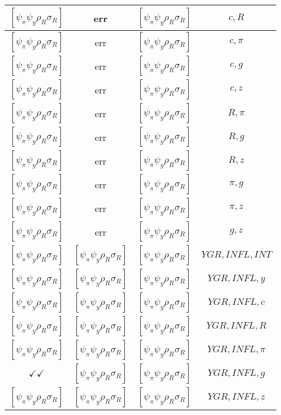 \documentclass[a4paper,10pt]{article}
\begin{document}
\begin{longtable}{|c|c|c|c|}
\hline
$[\psi_\pi \psi_y \rho_R \sigma_R ]$ & err & $[\psi_\pi \psi_y \rho_R \sigma_R ]$ & ${c},{R}$ \\
\hline
$[\psi_\pi \psi_y \rho_R \sigma_R ]$ & err & $[\psi_\pi \psi_y \rho_R \sigma_R ]$ & ${c},{\pi}$ \\
\hline
$[\psi_\pi \psi_y \rho_R \sigma_R ]$ & err & $[\psi_\pi \psi_y \rho_R \sigma_R ]$ & ${c},{g}$ \\
\hline
$[\psi_\pi \psi_y \rho_R \sigma_R ]$ & err & $[\psi_\pi \psi_y \rho_R \sigma_R ]$ & ${c},{z}$ \\
\hline
$[\psi_\pi \psi_y \rho_R \sigma_R ]$ & err & $[\psi_\pi \psi_y \rho_R \sigma_R ]$ & ${R},{\pi}$ \\
\hline
$[\psi_\pi \psi_y \rho_R \sigma_R ]$ & err & $[\psi_\pi \psi_y \rho_R \sigma_R ]$ & ${R},{g}$ \\
\hline
$[\psi_\pi \psi_y \rho_R \sigma_R ]$ & err & $[\psi_\pi \psi_y \rho_R \sigma_R ]$ & ${R},{z}$ \\
\hline
$[\psi_\pi \psi_y \rho_R \sigma_R ]$ & err & $[\psi_\pi \psi_y \rho_R \sigma_R ]$ & ${\pi},{g}$ \\
\hline
$[\psi_\pi \psi_y \rho_R \sigma_R ]$ & err & $[\psi_\pi \psi_y \rho_R \sigma_R ]$ & ${\pi},{z}$ \\
\hline
$[\psi_\pi \psi_y \rho_R \sigma_R ]$ & err & $[\psi_\pi \psi_y \rho_R \sigma_R ]$ & ${g},{z}$ \\
\hline
$[\psi_\pi \psi_y \rho_R \sigma_R ]$ & $[\psi_\pi \psi_y \rho_R \sigma_R ]$ & $[\psi_\pi \psi_y \rho_R \sigma_R ]$ & ${YGR},{INFL},{INT}$ \\
\hline
$[\psi_\pi \psi_y \rho_R \sigma_R ]$ & $[\psi_\pi \psi_y \rho_R \sigma_R ]$ & $[\psi_\pi \psi_y \rho_R \sigma_R ]$ & ${YGR},{INFL},{y}$ \\
\hline
$[\psi_\pi \psi_y \rho_R \sigma_R ]$ & $[\psi_\pi \psi_y \rho_R \sigma_R ]$ & $[\psi_\pi \psi_y \rho_R \sigma_R ]$ & ${YGR},{INFL},{c}$ \\
\hline
$[\psi_\pi \psi_y \rho_R \sigma_R ]$ & $[\psi_\pi \psi_y \rho_R \sigma_R ]$ & $[\psi_\pi \psi_y \rho_R \sigma_R ]$ & ${YGR},{INFL},{R}$ \\
\hline
$[\psi_\pi \psi_y \rho_R \sigma_R ]$ & $[\psi_\pi \psi_y \rho_R \sigma_R ]$ & $[\psi_\pi \psi_y \rho_R \sigma_R ]$ & ${YGR},{INFL},{\pi}$ \\
\hline
$\checkmark\checkmark$ & $[\psi_\pi \psi_y \rho_R \sigma_R ]$ & $[\psi_\pi \psi_y \rho_R \sigma_R ]$ & ${YGR},{INFL},{g}$ \\
\hline
$[\psi_\pi \psi_y \rho_R \sigma_R ]$ & $[\psi_\pi \psi_y \rho_R \sigma_R ]$ & $[\psi_\pi \psi_y \rho_R \sigma_R ]$ & ${YGR},{INFL},{z}$ \\

\end{longtable}
\end{document}
